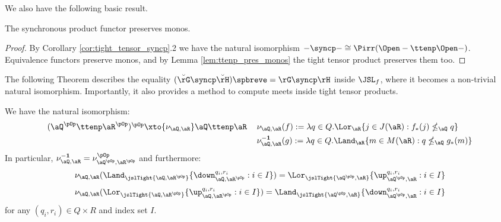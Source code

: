 \documentclass{article}
\begin{document}
We also have the following basic result.

\begin{corollary}
\label{cor:sync_prod_pres_monos}
The synchronous product functor preserves monos.
\end{corollary}

\begin{proof}
By Corollary \ref{cor:tight_tensor_syncp}.2 we have the natural isomorphism $- \syncp - \cong \Pirr(\Open - \ttenp \Open -)$. Equivalence functors preserve monos, and by Lemma \ref{lem:ttenp_pres_monos} the tight tensor product preserves them too.
\end{proof}

The following Theorem describes the equality $(\breve{\rG} \syncp \breve{\rH})\spbreve = \rG \syncp \rH$ inside $\JSL_f$, where it becomes a non-trivial natural isomorphism. Importantly, it also provides a method to compute meets inside tight tensor products.


\begin{theorem}
\label{thm:tight_self_dual}
\item
We have the natural isomorphism:
\[
\begin{tabular}{lll}
$(\aQ^{\pOp} \ttenp \aR^{\pOp})^{\pOp}  \xto{\nu_{\aQ,\aR}} \aQ \ttenp \aR$
& $\nu_{\aQ,\aR}(f) := \lambda q \in Q. \Lor_\aR \{ j \in J(\aR) : f_*(j) \nleq_\aQ q \}$
\\[1ex]
& $\nu_{\aQ,\aR}^{\bf-1}(g) := \lambda q \in Q. \Land_\aR \{ m \in M(\aR) : q \nleq_\aQ g_*(m) \}$
\end{tabular}
\]
In particular, $\nu_{\aQ,\aR}^{\bf-1} = \nu_{\aQ^{\pOp},\aR^{\pOp}}^{\pOp}$ and furthermore:
\[
\begin{tabular}{c}
$\nu_{\aQ,\aR}(\Land_{\jslTight{\aQ,\aR^{\pOp}}} \{ \down_{\aQ,\aR^{\pOp}}^{q_i,r_i} : i \in I \})
=  \Lor_{\jslTight{\aQ^{\pOp},\aR}} \{ \up_{\aQ^{\pOp},\aR}^{q_i,r_i} : i \in I \}$
\\[2ex]
$\nu_{\aQ,\aR}(\Lor_{\jslTight{\aQ,\aR^{\pOp}}} \{ \up_{\aQ,\aR^{\pOp}}^{q_i,r_i} : i \in I \})
=  \Land_{\jslTight{\aQ^{\pOp},\aR}} \{ \down_{\aQ^{\pOp},\aR}^{q_i,r_i} : i \in I \}$
\end{tabular}
\]
for any $(q_i,r_i) \in Q \times R$ and index set $I$.
\end{theorem}
\end{document}
